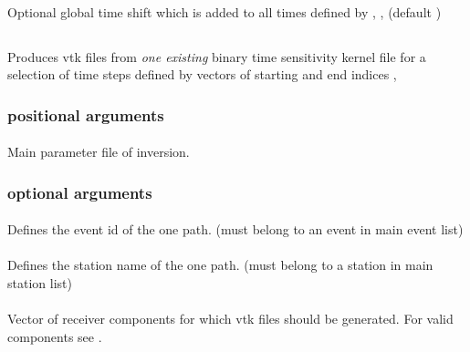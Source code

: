 \paragraph{}
Optional global time shift which is added to all times defined by , ,  (default )
%
%
\subsection{} \label{programs_scripts,sec:bin_prog,sec:timeKernel_2_vtk}
Produces vtk files from \emph{one existing} binary time sensitivity kernel file for a selection of time steps defined by vectors of starting and end indices  , 

\subsubsection{positional arguments}
\paragraph{}
Main parameter file of inversion.
\subsubsection{optional arguments}
\paragraph{ }
Defines the event id of the one path. (must belong to an event in main event list)
\paragraph{ }
Defines the station name of the one path. (must belong to a station in main station list)
\paragraph{}
Vector of receiver components for which vtk files should be generated. For valid components see .
